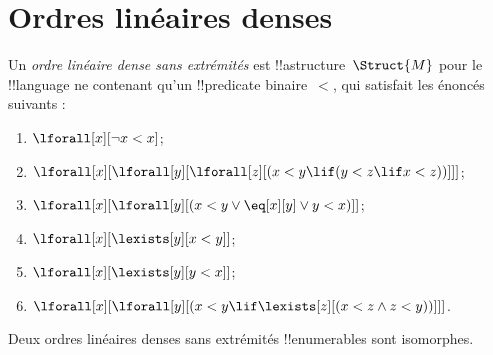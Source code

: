 \documentclass[../../../include/open-logic-section]{subfiles}
\begin{document}
\section{Ordres linéaires denses}

\begin{defn}
  Un \emph{ordre linéaire dense sans extrémités} est
  !!a{structure}~$\Struct{M}$ pour le !!{language}
  ne contenant qu'un !!{predicate} binaire~$<$,
  qui satisfait les énoncés suivants :
  \begin{enumerate}
  \item $\lforall[x][\lnot x < x]$;
  \item $\lforall[x][\lforall[y][\lforall[z][(x < y \lif (y < z \lif x
    <z ))]]]$;
  \item $\lforall[x][\lforall[y][(x< y \lor \eq[x][y] \lor y < x)]]$;
  \item $\lforall[x][\lexists[y][x < y]]$;
  \item $\lforall[x][\lexists[y][y < x]]$;
  \item $\lforall[x][\lforall[y][(x < y \lif \lexists[z][(x < z \land
        z < y))]]]$.
 \end{enumerate}
\end{defn}

\begin{thm}
  Deux ordres linéaires denses sans extrémités
  !!{enumerable}s sont isomorphes.
\end{thm}
\end{document}
